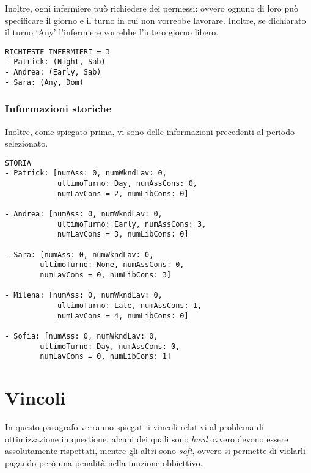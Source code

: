 Inoltre, ogni infermiere può richiedere dei permessi: ovvero ognuno di loro può specificare il giorno e il turno in cui non vorrebbe lavorare. Inoltre, se dichiarato il turno `Any' l'infermiere vorrebbe l'intero giorno libero.

\begin{verbatim}
RICHIESTE INFERMIERI = 3
- Patrick: (Night, Sab)
- Andrea: (Early, Sab)
- Sara: (Any, Dom)
\end{verbatim}

\subsubsection*{Informazioni storiche}
Inoltre, come spiegato prima, vi sono delle informazioni precedenti al periodo selezionato.

\begin{verbatim}
STORIA
- Patrick: [numAss: 0, numWkndLav: 0, 
			ultimoTurno: Day, numAssCons: 0, 
			numLavCons = 2, numLibCons: 0]
			
- Andrea: [numAss: 0, numWkndLav: 0, 
			ultimoTurno: Early, numAssCons: 3, 
			numLavCons = 3, numLibCons: 0]
			
- Sara: [numAss: 0, numWkndLav: 0, 
		ultimoTurno: None, numAssCons: 0, 
		numLavCons = 0, numLibCons: 3]
		
- Milena: [numAss: 0, numWkndLav: 0, 
			ultimoTurno: Late, numAssCons: 1, 
			numLavCons = 4, numLibCons: 0]
			
- Sofia: [numAss: 0, numWkndLav: 0, 
		ultimoTurno: Day, numAssCons: 0, 
		numLavCons = 0, numLibCons: 1]
\end{verbatim}

\section{Vincoli}
In questo paragrafo verranno spiegati i vincoli relativi al problema di ottimizzazione in questione, alcuni dei quali sono \textit{hard} ovvero devono essere assolutamente rispettati, mentre gli altri sono \textit{soft}, ovvero si permette di violarli pagando però una penalità nella funzione obbiettivo.

